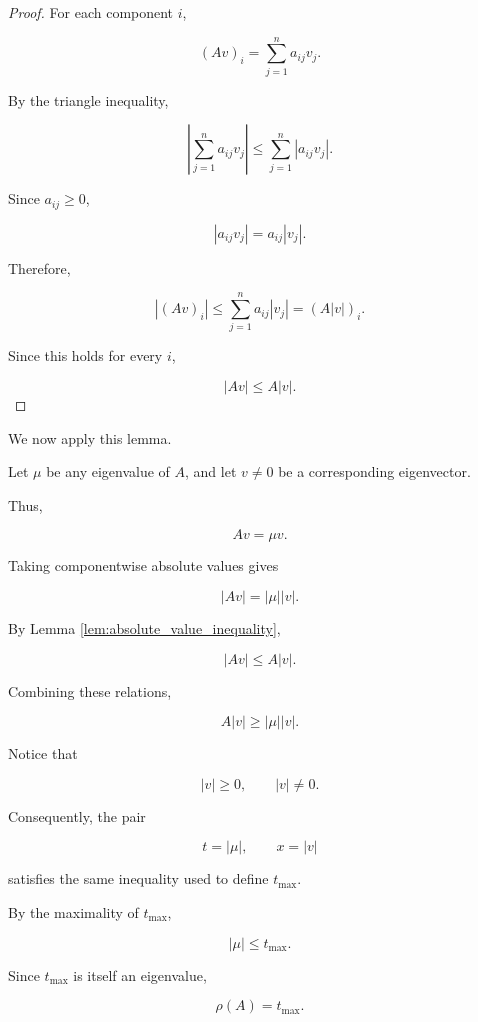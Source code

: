 \documentclass[11pt,a4paper]{article}
\theoremstyle{definition}
\theoremstyle{remark}
\begin{document}
\begin{proof}

For each component $i$,

\[
(Av)_i
=
\sum_{j=1}^{n}a_{ij}v_j.
\]

By the triangle inequality,

\[
\left|
\sum_{j=1}^{n}a_{ij}v_j
\right|
\leq
\sum_{j=1}^{n}|a_{ij}v_j|.
\]

Since $a_{ij}\geq0$,

\[
|a_{ij}v_j|
=
a_{ij}|v_j|.
\]

Therefore,

\[
|(Av)_i|
\leq
\sum_{j=1}^{n}a_{ij}|v_j|
=
(A|v|)_i.
\]

Since this holds for every $i$,

\[
|Av|\leq A|v|.
\]

\end{proof}

We now apply this lemma.

Let $\mu$ be any eigenvalue
of $A$, and let $v\neq0$
be a corresponding eigenvector.

Thus,

\[
Av=\mu v.
\]

Taking componentwise
absolute values gives

\[
|Av|=|\mu||v|.
\]

By Lemma
\ref{lem:absolute_value_inequality},

\[
|Av|\leq A|v|.
\]

Combining these relations,

\begin{equation}
A|v|\geq|\mu||v|.
\label{eq:perron_any_eigenvalue}
\end{equation}

Notice that

\[
|v|\geq0,
\qquad
|v|\neq0.
\]

Consequently, the pair

\[
t=|\mu|,
\qquad
x=|v|
\]

satisfies the same inequality
used to define $t_{\max}$.

By the maximality of
$t_{\max}$,

\[
|\mu|\leq t_{\max}.
\]

Since $t_{\max}$ is itself
an eigenvalue,

\begin{equation}
\boxed{
\rho(A)=t_{\max}.
}
\label{eq:perron_spectral_radius}
\end{equation}
\end{document}
